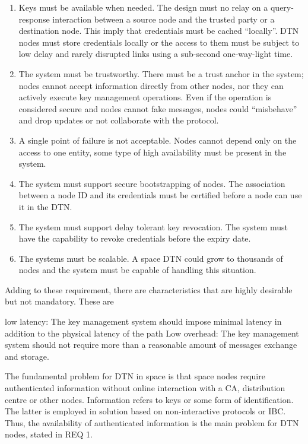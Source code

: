 \begin{enumerate}
    \item Keys must be available when needed. The design must no relay on a query-response interaction between a source node and the trusted party or a destination node. This imply that credentials must be cached ``locally''. DTN nodes must store credentials locally or the access to them must be subject to low delay and rarely disrupted links using a sub-second one-way-light time.
    \item The system must be trustworthy. There must be a trust anchor in the system; nodes cannot accept information directly from other nodes, nor they can actively execute key management operations. Even if the operation is considered secure and nodes cannot fake messages, nodes could ``misbehave'' and drop updates or not collaborate with the protocol.
    \item A single point of failure is not acceptable. Nodes cannot depend only on the access to one entity,  some type of high availability must be present in the system.
    \item The system must support secure bootstrapping of nodes. The association between a node ID and its credentials must be certified before a node can use it in the DTN.
    \item The system must support delay tolerant key revocation. The system must have the capability to revoke credentials before the expiry date. 
    \item The systems must be scalable. A space DTN could grow to thousands of nodes and the system must be capable of handling this situation. 
\end{enumerate}


Adding to these requirement, there are characteristics that are highly desirable but not mandatory. These are 

low latency: The key management system should impose minimal latency in addition to the physical latency of the path
Low overhead: The key management system should not require more than a reasonable amount of messages exchange and storage. 
  

The fundamental problem for DTN in space is that space nodes require authenticated information without online interaction with a CA, distribution centre or other nodes. Information refers to keys or some form of identification. The latter is employed in solution based on non-interactive protocols or IBC. Thus, the availability of authenticated information is the main problem for DTN nodes, stated in REQ 1.




